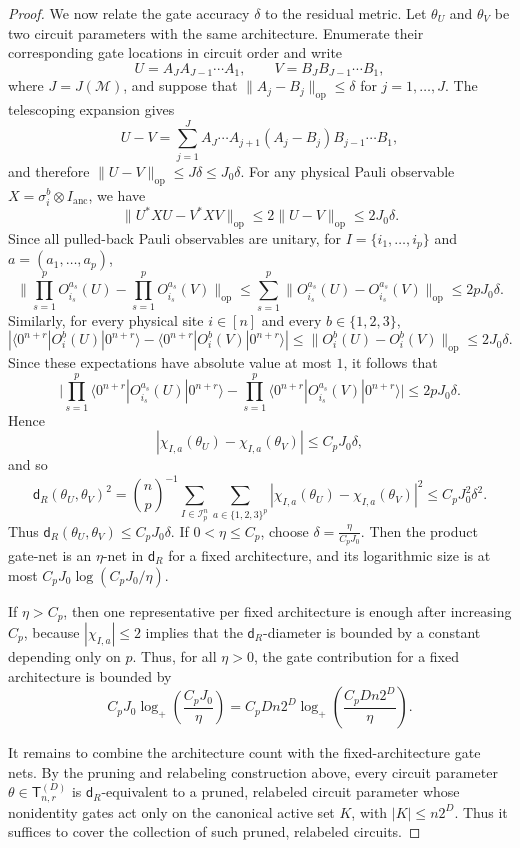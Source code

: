 \documentclass[10pt,a4paper]{amsart}
\newcommand{\mcI}{\mathcal{I}}
\begin{document}
\begin{proof}
We now relate the gate accuracy \(\delta\) to the residual metric. Let \(\theta_U\) and \(\theta_V\) be two circuit parameters with the same
architecture. Enumerate their corresponding gate locations in circuit order and write
\[
    U=A_J A_{J-1}\cdots A_1,
    \qquad
    V=B_JB_{J-1}\cdots B_1,
\]
where \(J=J(\mathcal M)\), and suppose that $\|A_j-B_j\|_{\mathrm{op}}\le\delta$ for $j=1,\dots,J$. The telescoping expansion gives
\[
    U-V
    =
    \sum_{j=1}^J
    A_J\cdots A_{j+1}
    (A_j-B_j)
    B_{j-1}\cdots B_1,
\]
and therefore $\|U-V\|_{\mathrm{op}} \le J\delta \le J_0\delta$. For any physical Pauli observable \(X=\sigma_i^b\otimes I_{\mathrm{anc}}\), we have
\[
    \|U^*XU-V^*XV\|_{\mathrm{op}}
    \le
    2\|U-V\|_{\mathrm{op}}
    \le
    2J_0\delta.
\]
Since all pulled-back Pauli observables are unitary, for
\(I=\{i_1,\dots,i_p\}\) and \(a=(a_1,\dots,a_p)\),
\[
\big\|
\prod_{s=1}^p O_{i_s}^{a_s}(U)
-
\prod_{s=1}^p O_{i_s}^{a_s}(V)
\big\|_{\mathrm{op}}
\le
\sum_{s=1}^p
\|O_{i_s}^{a_s}(U)-O_{i_s}^{a_s}(V)\|_{\mathrm{op}}
\le
2pJ_0\delta.
\]
Similarly, for every physical site \(i\in[n]\) and every \(b\in\{1,2,3\}\),
\[
\left|
\langle 0^{n+r}|O_i^b(U)|0^{n+r}\rangle
-
\langle 0^{n+r}|O_i^b(V)|0^{n+r}\rangle
\right|
\le
\|O_i^b(U)-O_i^b(V)\|_{\mathrm{op}}
\le
2J_0\delta .
\]
Since these expectations have absolute value at most \(1\), it follows that
\[
\big|
\prod_{s=1}^p
\langle 0^{n+r}|O_{i_s}^{a_s}(U)|0^{n+r}\rangle
-
\prod_{s=1}^p
\langle 0^{n+r}|O_{i_s}^{a_s}(V)|0^{n+r}\rangle
\big|
\le
2pJ_0\delta .
\]
Hence
\[
    |\chi_{I,a}(\theta_U)-\chi_{I,a}(\theta_V)|
    \le C_pJ_0\delta,
\]
and so
\[
\mathsf d_R(\theta_U,\theta_V)^2
=
\binom np^{-1}
\sum_{I\in\mcI_p^n}
\sum_{a\in\{1,2,3\}^p}
|\chi_{I,a}(\theta_U)-\chi_{I,a}(\theta_V)|^2
\le C_pJ_0^2\delta^2.
\]
Thus $\mathsf{d}_{R}(\theta_U,\theta_V)\le C_pJ_0\delta$. If \(0<\eta\le C_p\), choose $\delta=\frac{\eta}{C_pJ_0}.$ Then the product gate-net is an \(\eta\)-net in \(\mathsf{d}_{R}\) for a
fixed architecture, and its logarithmic size is at most $C_pJ_0\log (C_pJ_0/\eta)$.

If \(\eta>C_p\), then one representative per fixed architecture is enough
after increasing \(C_p\), because \(|\chi_{I,a}|\le2\) implies that the
\(\mathsf{d}_{R}\)-diameter is bounded by a constant depending only on $p$.
Thus, for all \(\eta>0\), the gate contribution for a fixed architecture is
bounded by
\[
    C_pJ_0\log_+\left(\frac{C_pJ_0}{\eta}\right)
    =
    C_pDn2^D
    \log_+\left(\frac{C_pDn2^D}{\eta}\right).
\]

It remains to combine the architecture count with the fixed-architecture gate nets. By the pruning and relabeling construction above, every circuit parameter
\(\theta\in\mathsf{T}_{n,r}^{(D)}\) is \(\mathsf{d}_{R}\)-equivalent to a
pruned, relabeled circuit parameter whose nonidentity gates act only on the
canonical active set \(K\), with \(|K|\le n2^D\). Thus it suffices to cover the collection of such pruned, relabeled circuits.


\end{proof}
\end{document}
